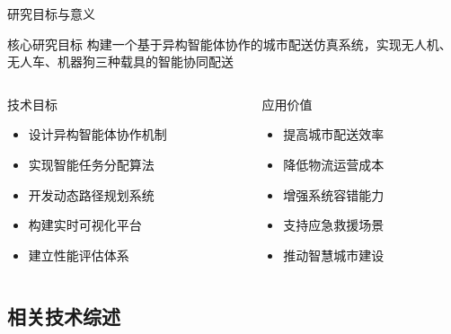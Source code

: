\documentclass[
10pt,
aspectratio=169,
]{beamer}
\begin{document}
\begin{frame}{研究目标与意义}
    \begin{block}{核心研究目标}
        构建一个基于异构智能体协作的城市配送仿真系统，实现无人机、无人车、机器狗三种载具的智能协同配送
    \end{block}
    
    \begin{columns}
        \begin{column}{0.5\textwidth}
            \begin{exampleblock}{技术目标}
                \begin{itemize}
                    \item 设计异构智能体协作机制
                    \item 实现智能任务分配算法
                    \item 开发动态路径规划系统
                    \item 构建实时可视化平台
                    \item 建立性能评估体系
                \end{itemize}
            \end{exampleblock}
        \end{column}
        \begin{column}{0.5\textwidth}
            \begin{exampleblock}{应用价值}
                \begin{itemize}
                    \item 提高城市配送效率
                    \item 降低物流运营成本
                    \item 增强系统容错能力
                    \item 支持应急救援场景
                    \item 推动智慧城市建设
                \end{itemize}
            \end{exampleblock}
        \end{column}
    \end{columns}
\end{frame}

\subsection{相关技术综述}
\end{document}
